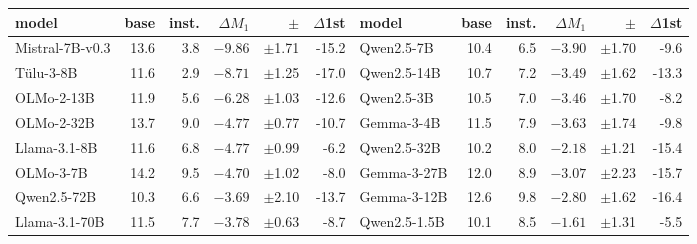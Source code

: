\begin{center}\scriptsize\setlength{\tabcolsep}{4pt}
\begin{tabular}{lrrrrr @{\hspace{1.0em}} lrrrrr}\toprule
model & base & inst. & $\Delta M_1$ & $\pm$ & $\Delta$1st & model & base & inst. & $\Delta M_1$ & $\pm$ & $\Delta$1st \\ \midrule
Mistral-7B-v0.3 & 13.6 & 3.8 & $-9.86$ & $\pm$1.71 & -15.2 & Qwen2.5-7B & 10.4 & 6.5 & $-3.90$ & $\pm$1.70 & -9.6 \\
T\"ulu-3-8B & 11.6 & 2.9 & $-8.71$ & $\pm$1.25 & -17.0 & Qwen2.5-14B & 10.7 & 7.2 & $-3.49$ & $\pm$1.62 & -13.3 \\
OLMo-2-13B & 11.9 & 5.6 & $-6.28$ & $\pm$1.03 & -12.6 & Qwen2.5-3B & 10.5 & 7.0 & $-3.46$ & $\pm$1.70 & -8.2 \\
OLMo-2-32B & 13.7 & 9.0 & $-4.77$ & $\pm$0.77 & -10.7 & Gemma-3-4B & 11.5 & 7.9 & $-3.63$ & $\pm$1.74 & -9.8 \\
Llama-3.1-8B & 11.6 & 6.8 & $-4.77$ & $\pm$0.99 & -6.2 & Qwen2.5-32B & 10.2 & 8.0 & $-2.18$ & $\pm$1.21 & -15.4 \\
OLMo-3-7B & 14.2 & 9.5 & $-4.70$ & $\pm$1.02 & -8.0 & Gemma-3-27B & 12.0 & 8.9 & $-3.07$ & $\pm$2.23 & -15.7 \\
Qwen2.5-72B & 10.3 & 6.6 & $-3.69$ & $\pm$2.10 & -13.7 & Gemma-3-12B & 12.6 & 9.8 & $-2.80$ & $\pm$1.62 & -16.4 \\
Llama-3.1-70B & 11.5 & 7.7 & $-3.78$ & $\pm$0.63 & -8.7 & Qwen2.5-1.5B & 10.1 & 8.5 & $-1.61$ & $\pm$1.31 & -5.5 \\
\bottomrule\end{tabular}\end{center}
